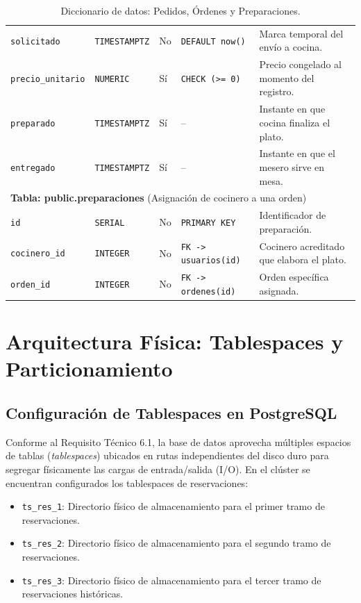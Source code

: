 \documentclass[11pt,letterpaper]{article}
\begin{document}
\begin{table}[h!]
\begin{tabularx}{\textwidth}{l l l p{2.8cm} X}
\texttt{solicitado} & \texttt{TIMESTAMPTZ} & No & \texttt{DEFAULT now()} & Marca temporal del envío a cocina. \\
\texttt{precio\_unitario} & \texttt{NUMERIC} & Sí & \texttt{CHECK (>= 0)} & Precio congelado al momento del registro. \\
\texttt{preparado} & \texttt{TIMESTAMPTZ} & Sí & -- & Instante en que cocina finaliza el plato. \\
\texttt{entregado} & \texttt{TIMESTAMPTZ} & Sí & -- & Instante en que el mesero sirve en mesa. \\
\midrule
\multicolumn{5}{l}{\textbf{Tabla: public.preparaciones} (Asignación de cocinero a una orden)} \\
\texttt{id} & \texttt{SERIAL} & No & \texttt{PRIMARY KEY} & Identificador de preparación. \\
\texttt{cocinero\_id} & \texttt{INTEGER} & No & \texttt{FK -> usuarios(id)} & Cocinero acreditado que elabora el plato. \\
\texttt{orden\_id} & \texttt{INTEGER} & No & \texttt{FK -> ordenes(id)} & Orden específica asignada. \\
\bottomrule
\end{tabularx}
\caption{Diccionario de datos: Pedidos, Órdenes y Preparaciones.}
\label{tab:dict_pedidos}
\end{table}

\newpage
\section{Arquitectura Física: Tablespaces y Particionamiento}

\subsection{Configuración de Tablespaces en PostgreSQL}
Conforme al Requisito Técnico 6.1, la base de datos aprovecha múltiples espacios de tablas (\textit{tablespaces}) ubicados en rutas independientes del disco duro para segregar físicamente las cargas de entrada/salida (I/O). En el clúster se encuentran configurados los tablespaces de reservaciones:
\begin{itemize}[leftmargin=*]
    \item \texttt{ts\_res\_1}: Directorio físico de almacenamiento para el primer tramo de reservaciones.
    \item \texttt{ts\_res\_2}: Directorio físico de almacenamiento para el segundo tramo de reservaciones.
    \item \texttt{ts\_res\_3}: Directorio físico de almacenamiento para el tercer tramo de reservaciones históricas.
\end{itemize}
\end{document}
